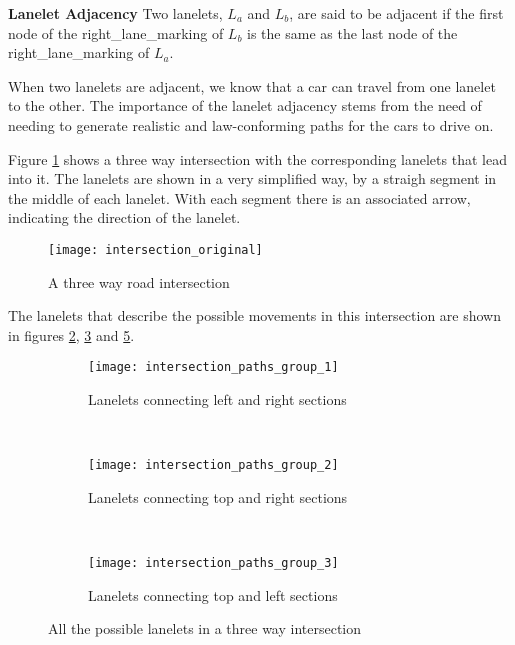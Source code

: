 \textbf{Lanelet Adjacency} Two lanelets, $L_a$ and $L_b$, are said to be adjacent if the first node of the right\_lane\_marking of $L_b$ is the same as the last node of the right\_lane\_marking of $L_a$.

When two lanelets are adjacent, we know that a car can travel from one lanelet to the other. The importance of the lanelet adjacency stems from the need of needing to generate realistic and law-conforming paths for the cars to drive on.

Figure \ref{fig:intersection_original} shows a three way intersection with the corresponding lanelets that lead into it. The lanelets are shown in a very simplified way, by a straigh segment in the middle of each lanelet. With each segment there is an associated arrow, indicating the direction of the lanelet.

\begin{figure}[h!]
    \centering
    \texttt{[image: intersection\_original]}
    \caption{A three way road intersection \label{fig:intersection_original} }
\end{figure}

The lanelets that describe the possible movements in this intersection are shown in figures \ref{fig:intersection_paths_group_1}, \ref{fig:intersection_paths_group_2} and \ref{fig:intersection_paths_group_3}.

\begin{figure}
    \centering
    \begin{subfigure}[b]{0.3\textwidth}
        \texttt{[image: intersection\_paths\_group\_1]}
        \caption{Lanelets connecting left and right sections}
        \label{fig:intersection_paths_group_1}
    \end{subfigure}
    ~ %
    \begin{subfigure}[b]{0.3\textwidth}
        \texttt{[image: intersection\_paths\_group\_2]}
        \caption{Lanelets connecting top and right sections}
        \label{fig:intersection_paths_group_2}
    \end{subfigure}
    ~ %
    \begin{subfigure}[b]{0.3\textwidth}
        \texttt{[image: intersection\_paths\_group\_3]}
        \caption{Lanelets connecting top and left sections}
        \label{fig:intersection_paths_group_3}
    \end{subfigure}
    \caption{All the possible lanelets in a three way intersection}
\end{figure}

